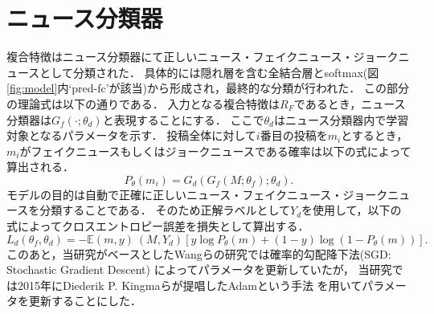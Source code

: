 \section{ニュース分類器}
%
複合特徴はニュース分類器にて正しいニュース・フェイクニュース・ジョークニュースとして分類された．
具体的には隠れ層を含む全結合層とsoftmax(図\ref{fig:model}内`pred-fc'が該当)から形成され，最終的な分類が行われた．
この部分の理論式は以下の通りである．
入力となる複合特徴は$R_F$であるとき，ニュース分類器は$G_f(\cdot; \theta_d)$と表現することにする．
ここで$\theta_d$はニュース分類器内で学習対象となるパラメータを示す．
投稿全体に対して$i$番目の投稿を$m_i$とするとき，
$m_i$がフェイクニュースもしくはジョークニュースである確率は以下の式によって算出される．
\begin{equation}
    \label{eq:news_classify}
    P_\theta(m_i) = G_d(G_f(M; \theta_f); \theta_d).
\end{equation}
モデルの目的は自動で正確に正しいニュース・フェイクニュース・ジョークニュースを分類することである．
そのため正解ラベルとして$Y_d$を使用して，以下の式によってクロスエントロピー誤差を損失として算出する．
\begin{equation}
    \label{eq:cross_entropy}
    L_d(\theta_f, \theta_d) = -\mathbb{E}{(m,y)~(M, Y_d)}[y\log P_\theta(m) + (1-y)\log (1-P_\theta(m))].
\end{equation}
このあと，当研究がベースとしたWangらの研究では確率的勾配降下法(SGD: Stochastic Gradient Descent)
によってパラメータを更新していたが，
当研究では2015年にDiederik P. Kingmaらが提唱したAdamという手法\cite{DBLP:journals/corr/KingmaB14}
を用いてパラメータを更新することにした．
%
%
\newpage
%
%
%
%
%
%
%
%
%
%
% 
